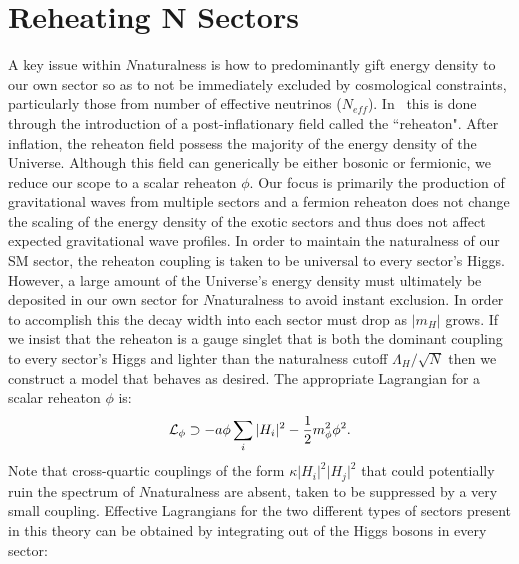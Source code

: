 \documentclass[nofootinbib,twocolumn,preprintnumbers]{revtex4-1}
\begin{document}
\section{Reheating N Sectors}
\label{sec:reheat}
A key issue within $N$naturalness is how to predominantly gift energy density to our own sector so as to not be immediately excluded by cosmological constraints, particularly those from number of effective neutrinos ($N_{eff}$). In~\cite{Arkani-Hamed:2016rle} this is done through the introduction of a post-inflationary field called the ``reheaton". After inflation, the reheaton field possess the majority of the energy density of the Universe. Although this field can generically be either bosonic or fermionic, we reduce our scope to a scalar reheaton $\phi$. Our focus is primarily the production of gravitational waves from multiple sectors and a fermion reheaton does not change the scaling of the energy density of the exotic sectors and thus does not affect expected gravitational wave profiles.
In order to maintain the naturalness of our SM sector, the reheaton coupling is taken to be universal to every sector's Higgs. However, a large amount of the Universe's energy density must ultimately be deposited in our own sector for $N$naturalness to avoid instant exclusion. In order to accomplish this the decay width into each sector must drop as $\vert m_H\vert$ grows. If we insist that the reheaton is a gauge singlet that is both the dominant coupling to every sector's Higgs and lighter than the naturalness cutoff $\Lambda_H/\sqrt{N}$ then we construct a model that behaves as desired. 
The appropriate Lagrangian for a scalar reheaton $\phi$ is: 
\begin{equation}\label{eqn:nnLagrangian}
{\cal L}_\phi \supset -a\phi\sum_i\vert H_i\vert^2 - \frac{1}{2}m^2_\phi \phi^2.
\end{equation}
Note that cross-quartic couplings of the form $\kappa\vert H_i\vert^2\vert H_j\vert^2$ that could potentially ruin the spectrum of $N$naturalness are absent, taken to be suppressed by a very small coupling. Effective Lagrangians for the two different types of sectors present in this theory can be obtained by integrating out of the Higgs bosons in every sector:
\end{document}
